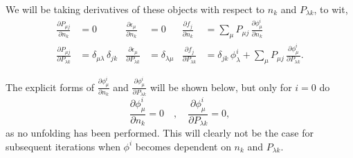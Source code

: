 We will be taking derivatives of these objects with respect to $n_{k}$ and $P_{\lambda k}$, to wit,
\begin{align} \label{eq:useful_derivs}
	\frac{\partial P_{\mu j}}{\partial n_{k}} &= 0
	&
	\frac{\partial \epsilon_{\mu}}{\partial n_{k}} &= 0
	&
	\frac{\partial f_{j}}{\partial n_{k}} &= \sum_{\mu}{P_{\mu j} \, \frac{\partial \phi^{i}_{\mu}}{\partial n_{k}}} \\
  	\frac{\partial P_{\mu j}}{\partial P_{\lambda k}} &= \delta_{\mu \lambda} \, \delta_{jk}
	&
	\frac{\partial \epsilon_{\mu}}{\partial P_{\lambda k}} &= \delta_{\lambda \mu}
	&
	\frac{\partial f_{j}}{\partial P_{\lambda k}} &= \delta_{jk} \, \phi^{i}_{\lambda} + \sum_{\mu} {P_{\mu j} \, \frac{\partial \phi^{i}_{\mu}}{\partial P_{\lambda k}}}.
\end{align}


The explicit forms of $\frac{\partial \phi^{i}_{\mu}}{\partial n_{k}}$ and $\frac{\partial \phi^{i}_{\mu}}{\partial P_{\lambda k}}$ will be shown below, but only for $i=0$ do
\begin{equation} \label{eq:first_deriv}
	\frac{\partial \phi^{i}_{\mu}}{\partial n_{k}} = 0 \quad , \quad \frac{\partial \phi^{i}_{\mu}}{\partial P_{\lambda k}} = 0,
\end{equation}
as no unfolding has been performed. This will clearly not be the case for subsequent iterations when $\phi^{i}$ becomes dependent on $n_{k}$ and $P_{\lambda k}$.

